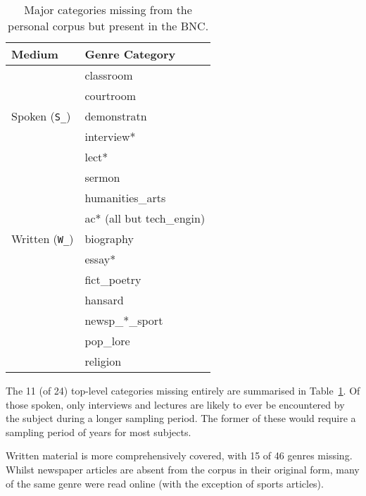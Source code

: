 \begin{table}[ht]
    \centering

    \begin{tabular}{ |l|l| }
        \hline
        Medium & Genre Category \\ \hline
        \multirow{5}{*}{Spoken (\texttt{S\_})} 
                                & classroom \\
                                & courtroom \\
                                & demonstratn \\
                                & interview* \\
                                & lect* \\
                                & sermon \\
        \hline
        \multirow{5}{*}{Written (\texttt{W\_})} 
                                & humanities\_arts \\
                                & ac* (all but tech\_engin) \\
                                & biography \\
                                & essay* \\
                                & fict\_poetry \\
                                & hansard \\
                                & newsp\_*\_sport \\
                                & pop\_lore \\
                                & religion \\
        \hline
    \end{tabular}
    \caption{Major categories missing from the personal corpus but present in the BNC.}
    \label{table:personal:missingcatspersonal}
\end{table}


The 11 (of 24) top-level categories missing entirely are summarised in Table~\ref{table:personal:missingcatspersonal}.  Of those spoken, only interviews and lectures are likely to ever be encountered by the subject during a longer sampling period.  The former of these would require a sampling period of years for most subjects.

Written material is more comprehensively covered, with 15 of 46 genres missing.  Whilst newspaper articles are absent from the corpus in their original form, many of the same genre were read online (with the exception of sports articles).  

